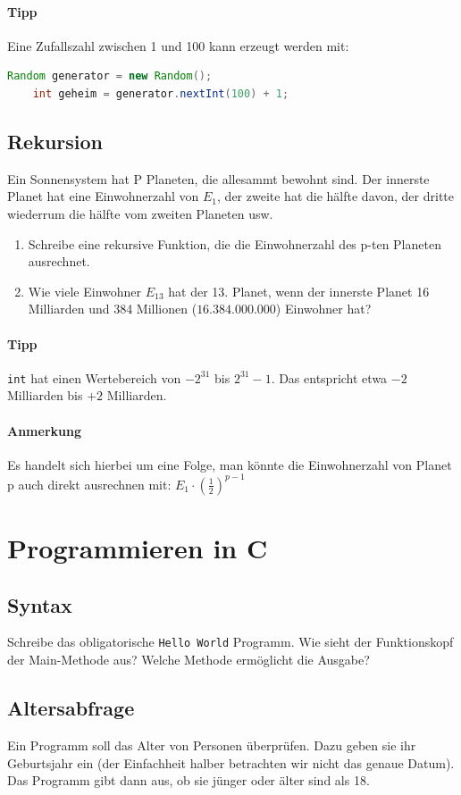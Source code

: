 \documentclass[11pt, a4paper]{article}
\begin{document}
\paragraph{Tipp} Eine Zufallszahl zwischen 1 und 100 kann erzeugt werden mit:
\begin{lstlisting}[language=Java]
	Random generator = new Random();
	int geheim = generator.nextInt(100) + 1;
\end{lstlisting}

\subsection{Rekursion}
Ein Sonnensystem hat P Planeten, die allesammt bewohnt sind. Der innerste Planet hat eine Einwohnerzahl von $E_1$, der zweite hat die hälfte davon, der dritte wiederrum die hälfte vom zweiten Planeten usw.
\begin{enumerate}
	\item Schreibe eine rekursive Funktion, die die Einwohnerzahl des p-ten Planeten ausrechnet.
	\item Wie viele Einwohner $E_{13}$ hat der 13. Planet, wenn der innerste Planet 16 Milliarden und 384 Millionen ($16.384.000.000$) Einwohner hat?
\end{enumerate}
\paragraph{Tipp} \texttt{int} hat einen Wertebereich von $-2^{31}$ bis $2^{31}-1$. Das entspricht etwa $-2$ Milliarden bis $+2$ Milliarden.
\paragraph{Anmerkung} Es handelt sich hierbei um eine Folge, man könnte die Einwohnerzahl von Planet p auch direkt ausrechnen mit: $E_1 \cdot \left(\frac{1}{2}\right)^{p-1}$

\newpage
\section{Programmieren in C}
\subsection{Syntax}
Schreibe das obligatorische \texttt{Hello World} Programm. Wie sieht der Funktionskopf der Main-Methode aus? Welche Methode ermöglicht die Ausgabe?

\subsection{Altersabfrage}
Ein Programm soll das Alter von Personen überprüfen. Dazu geben sie ihr Geburtsjahr ein (der Einfachheit halber betrachten wir nicht das genaue Datum). Das Programm gibt dann aus, ob sie jünger oder älter sind als 18.
\end{document}
